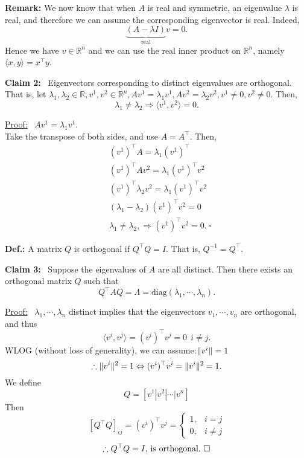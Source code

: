 \documentclass[letterpaper]{article}
\newcommand{\real}{\mathbb R}  %
\begin{document}
\textbf{Remark:} We now know that when $A$ is real and symmetric, an eigenvalue $\lambda$ is real, and therefore we can assume the corresponding eigenvector is real. Indeed, $$\underbrace{\left( A-\lambda I\right)}_\text{real}v=0.$$ Hence we have $v\in \real^n$ and we can use the real inner product on  $\real^n$, namely $\langle x,y \rangle=x^\top y$.

\textbf{Claim 2:}~ Eigenvectors corresponding to distinct eigenvalues are orthogonal. That is, let $\lambda_1, \lambda_2 \in \real, v^1, v^2 \in \real^n, Av^1=\lambda_1 v^1, Av^2=\lambda_2 v^2, v^1\neq0, v^2\neq0$. Then,
$$\lambda_1 \neq \lambda_2 \Rightarrow \langle v^1, v^2\rangle=0.$$

\underline{Proof:}~ $Av^1=\lambda_1v^1$.\\
    Take the transpose of both sides, and use $A=A^\top $. Then,
    \begin{align*}
        &(v^1)^\top A=\lambda_1(v^1)^\top\\
        & (v^1)^\top Av^2=\lambda_1(v^1)^\top v^2\\
        &(v^1)^\top \lambda_2 v^2=\lambda_1(v^1)^\top v^2\\
        &(\lambda_1-\lambda_2)(v^1)^\top v^2=0\\
        &\lambda_1\neq\lambda_2, \Rightarrow (v^1)^\top v^2=0.\ \square
    \end{align*}

\textbf{Def.:} A matrix $Q$ is orthogonal if $Q^\top Q=I$. That is, $Q^{-1}=Q^\top $.

\textbf{Claim 3:}~ Suppose the eigenvalues of $A$ are all distinct. Then there exists an orthogonal matrix $Q$ such that $$Q^\top AQ=\Lambda=\mathrm{diag}(\lambda_1,\dotsb ,\lambda_n).$$

\underline{Proof:}~ $\lambda_1,\dotsb ,\lambda_n$ distinct implies that the eigenvectors $v_1,\dotsb, v_n$ are orthogonal, and thus
    $$ \langle v^i, v^j \rangle = (v^i)^\top v^j = 0 ~~ i \ne j.$$
    WLOG (without loss of generality), we can assume:$\Arrowvert v^i \Arrowvert=1$
    $$\therefore \Arrowvert v^i \Arrowvert^2=1\Leftrightarrow(v^i)^\top v^i=\|v^i\|^2=1.$$
    We define $$Q=\left[v^1|v^2|\dotsb |v^n \right]$$
    Then
    $$\left[Q^\top Q\right]_{ij}=(v^i)^\top v^j=
    \begin{cases}
        1,& i=j  \\
        0,& i\neq j
    \end{cases}$$
    $$\therefore Q^\top Q=I\textnormal{, is orthogonal.}\ \square$$
\end{document}
